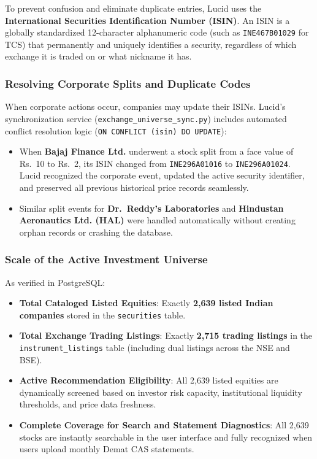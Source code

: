 To prevent confusion and eliminate duplicate entries, Lucid uses the \textbf{International Securities Identification Number (ISIN)}. An ISIN is a globally standardized 12-character alphanumeric code (such as \texttt{INE467B01029} for TCS) that permanently and uniquely identifies a security, regardless of which exchange it is traded on or what nickname it has.

\subsubsection{Resolving Corporate Splits and Duplicate Codes}
When corporate actions occur, companies may update their ISINs. Lucid's synchronization service (\texttt{exchange\_universe\_sync.py}) includes automated conflict resolution logic (\texttt{ON CONFLICT (isin) DO UPDATE}):
\begin{itemize}
    \item When \textbf{Bajaj Finance Ltd.} underwent a stock split from a face value of Rs.~10 to Rs.~2, its ISIN changed from \texttt{INE296A01016} to \texttt{INE296A01024}. Lucid recognized the corporate event, updated the active security identifier, and preserved all previous historical price records seamlessly.
    \item Similar split events for \textbf{Dr.~Reddy's Laboratories} and \textbf{Hindustan Aeronautics Ltd. (HAL)} were handled automatically without creating orphan records or crashing the database.
\end{itemize}

\subsubsection{Scale of the Active Investment Universe}
As verified in PostgreSQL:
\begin{itemize}
    \item \textbf{Total Cataloged Listed Equities}: Exactly \textbf{2,639 listed Indian companies} stored in the \texttt{securities} table.
    \item \textbf{Total Exchange Trading Listings}: Exactly \textbf{2,715 trading listings} in the \texttt{instrument\_listings} table (including dual listings across the NSE and BSE).
    \item \textbf{Active Recommendation Eligibility}: All 2,639 listed equities are dynamically screened based on investor risk capacity, institutional liquidity thresholds, and price data freshness.
    \item \textbf{Complete Coverage for Search and Statement Diagnostics}: All 2,639 stocks are instantly searchable in the user interface and fully recognized when users upload monthly Demat CAS statements.
\end{itemize}

